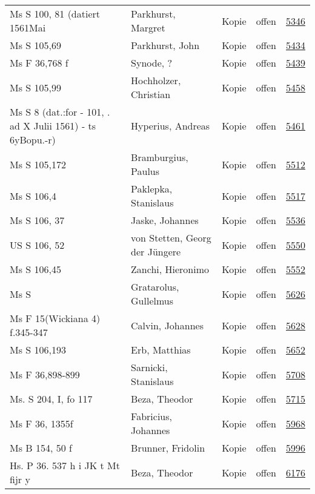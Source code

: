 \documentclass[10pt,a4paper,landscape]{report}
\begin{document}
\begin{longtable}{p{16cm}p{4cm}llr}
Ms S 100, 81 (datiert 1561Mai	&	Parkhurst, Margret	&	Kopie	&	offen	&	\href{http://130.60.24.72/assignment/5346}{5346}\\
Ms S 105,69	&	Parkhurst, John	&	Kopie	&	offen	&	\href{http://130.60.24.72/assignment/5434}{5434}\\
Ms F 36,768 f	&	Synode, ?	&	Kopie	&	offen	&	\href{http://130.60.24.72/assignment/5439}{5439}\\
Ms S 105,99	&	Hochholzer, Christian	&	Kopie	&	offen	&	\href{http://130.60.24.72/assignment/5458}{5458}\\
Ms S 8 (dat.:for - 101, . ad X Julii 1561) - ts 6yBopu.-r)	&	Hyperius, Andreas	&	Kopie	&	offen	&	\href{http://130.60.24.72/assignment/5461}{5461}\\
Ms S 105,172	&	Bramburgius, Paulus	&	Kopie	&	offen	&	\href{http://130.60.24.72/assignment/5512}{5512}\\
Ms S 106,4	&	Paklepka, Stanislaus	&	Kopie	&	offen	&	\href{http://130.60.24.72/assignment/5517}{5517}\\
Ms S 106, 37	&	Jaske, Johannes	&	Kopie	&	offen	&	\href{http://130.60.24.72/assignment/5536}{5536}\\
US S 106, 52	&	von Stetten, Georg der Jüngere	&	Kopie	&	offen	&	\href{http://130.60.24.72/assignment/5550}{5550}\\
Ms S 106,45	&	Zanchi, Hieronimo	&	Kopie	&	offen	&	\href{http://130.60.24.72/assignment/5552}{5552}\\
Ms S	&	Gratarolus, Gullelmus	&	Kopie	&	offen	&	\href{http://130.60.24.72/assignment/5626}{5626}\\
Ms F 15(Wickiana 4) f.345-347	&	Calvin, Johannes	&	Kopie	&	offen	&	\href{http://130.60.24.72/assignment/5628}{5628}\\
Ms S 106,193	&	Erb, Matthias	&	Kopie	&	offen	&	\href{http://130.60.24.72/assignment/5652}{5652}\\
Ms F 36,898-899	&	Sarnicki, Stanislaus	&	Kopie	&	offen	&	\href{http://130.60.24.72/assignment/5708}{5708}\\
Ms. S 204, I, fo 117	&	Beza, Theodor	&	Kopie	&	offen	&	\href{http://130.60.24.72/assignment/5715}{5715}\\
Ms F 36, 1355f	&	Fabricius, Johannes	&	Kopie	&	offen	&	\href{http://130.60.24.72/assignment/5968}{5968}\\
Ms B 154, 50 f	&	Brunner, Fridolin	&	Kopie	&	offen	&	\href{http://130.60.24.72/assignment/5996}{5996}\\
Hs. P 36. 537 h i JK t Mt fijr y	&	Beza, Theodor	&	Kopie	&	offen	&	\href{http://130.60.24.72/assignment/6176}{6176}\\

\end{longtable}
\end{document}
